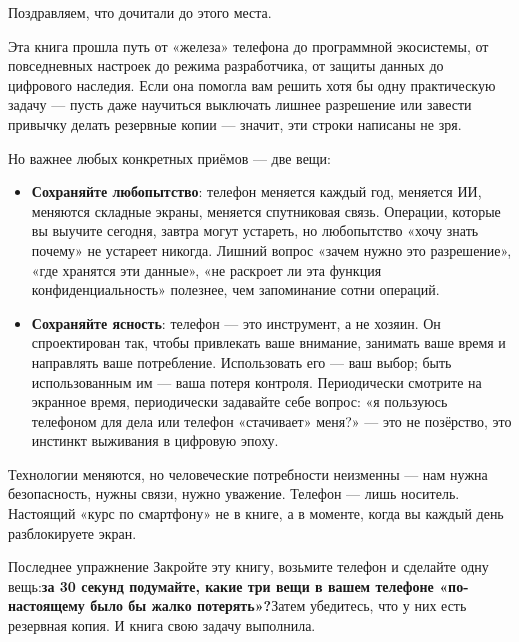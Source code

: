 
Поздравляем, что дочитали до этого места.

Эта книга прошла путь от «железа» телефона до программной экосистемы, от повседневных настроек до режима разработчика, от защиты данных до цифрового наследия. Если она помогла вам решить хотя бы одну практическую задачу — пусть даже научиться выключать лишнее разрешение или завести привычку делать резервные копии — значит, эти строки написаны не зря.

Но важнее любых конкретных приёмов — две вещи:

\begin{itemize}
  \item \textbf{Сохраняйте любопытство}: телефон меняется каждый год, меняется ИИ, меняются складные экраны, меняется спутниковая связь. Операции, которые вы выучите сегодня, завтра могут устареть, но любопытство «хочу знать почему» не устареет никогда. Лишний вопрос «зачем нужно это разрешение», «где хранятся эти данные», «не раскроет ли эта функция конфиденциальность» полезнее, чем запоминание сотни операций.
  \item \textbf{Сохраняйте ясность}: телефон — это инструмент, а не хозяин. Он спроектирован так, чтобы привлекать ваше внимание, занимать ваше время и направлять ваше потребление. Использовать его — ваш выбор; быть использованным им — ваша потеря контроля. Периодически смотрите на экранное время, периодически задавайте себе вопрос: «я пользуюсь телефоном для дела или телефон «стачивает» меня?» — это не позёрство, это инстинкт выживания в цифровую эпоху.
\end{itemize}

Технологии меняются, но человеческие потребности неизменны — нам нужна безопасность, нужны связи, нужно уважение. Телефон — лишь носитель. Настоящий «курс по смартфону» не в книге, а в моменте, когда вы каждый день разблокируете экран.

\begin{tcbpractice}{Последнее упражнение}
Закройте эту книгу, возьмите телефон и сделайте одну вещь:\textbf{за 30 секунд подумайте, какие три вещи в вашем телефоне «по-настоящему было бы жалко потерять»?}Затем убедитесь, что у них есть резервная копия. И книга свою задачу выполнила.

\end{tcbpractice}
